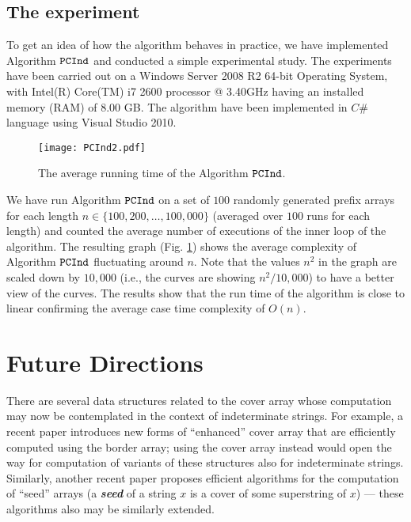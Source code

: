 \documentclass[runningheads,a4paper]{llncs}
\def\s#1{\mbox{\boldmath $#1$}}
\def\itbf#1{\textit{\textbf{#1}}}
\def\PCInd{\tt{PCInd}}
\begin{document}
\subsection{The experiment}
To get an idea of how the algorithm behaves in practice, we have
implemented Algorithm $\PCInd$ and conducted a simple experimental study. The
experiments have been carried out on a Windows Server
2008 R2 64-bit Operating System, with Intel(R) Core(TM) i7 2600 processor @
3.40GHz having an installed memory (RAM) of 8.00 GB. The algorithm have
been implemented in $C\#$ language using Visual Studio 2010.

\begin{figure}[h!]  
  \centering
  \texttt{[image: PCInd2.pdf]}
  \caption{The average running time of the Algorithm $\PCInd$.}
  \label{exp} 
\end{figure} 

We have run Algorithm $\PCInd$ on a set of $100$ randomly  generated prefix
arrays for each length $n \in \{100,200,\ldots,100,000\}$ (averaged over $100$
runs for each length) and counted the average number of executions of the inner
loop of the algorithm. The resulting graph (Fig. \ref{exp}) shows the average
complexity of Algorithm $\PCInd$ fluctuating around $n$. Note that the values
$n^2$ in the graph are scaled down by $10,000$ (i.e., the curves are showing
$n^2/10,000$) to have a better view of the curves. The results show that the
run time of the algorithm is close to linear confirming the average case time
complexity of $O(n)$.

\section{Future Directions}\label{sect-future}
There are several data structures related to the cover array
whose computation may now be contemplated in the context of
indeterminate strings.
For example, a recent paper \cite{FIKPPST13} introduces new forms
of ``enhanced'' cover array that are efficiently computed using the border array;
using the cover array instead would open the way for computation of variants
of these structures also for indeterminate strings.
Similarly, another recent paper \cite{CCIKPRRSW11} proposes efficient
algorithms for the computation of ``seed'' arrays
(a \itbf{seed} of a string \s{x} is a cover of some superstring of \s{x}) --- these
algorithms also may be similarly extended.
\end{document}

